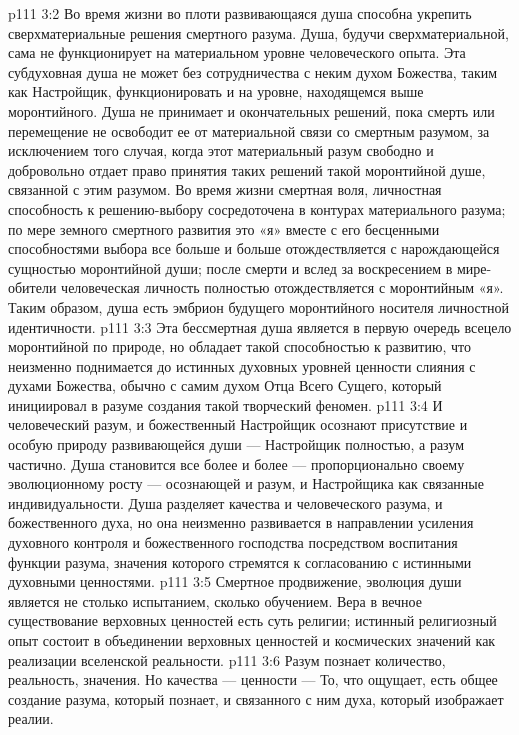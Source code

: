 \vs p111 3:2 Во время жизни во плоти развивающаяся душа способна укрепить сверхматериальные решения смертного разума. Душа, будучи сверхматериальной, сама не функционирует на материальном уровне человеческого опыта. Эта субдуховная душа не может без сотрудничества с неким духом Божества, таким как Настройщик, функционировать и на уровне, находящемся выше моронтийного. Душа не принимает и окончательных решений, пока смерть или перемещение не освободит ее от материальной связи со смертным разумом, за исключением того случая, когда этот материальный разум свободно и добровольно отдает право принятия таких решений такой моронтийной душе, связанной с этим разумом. Во время жизни смертная воля, личностная способность к решению\hyp{}выбору сосредоточена в контурах материального разума; по мере земного смертного развития это «я» вместе с его бесценными способностями выбора все больше и больше отождествляется с нарождающейся сущностью моронтийной души; после смерти и вслед за воскресением в мире\hyp{}обители человеческая личность полностью отождествляется с моронтийным «я». Таким образом, душа есть эмбрион будущего моронтийного носителя личностной идентичности.
\vs p111 3:3 Эта бессмертная душа является в первую очередь всецело моронтийной по природе, но обладает такой способностью к развитию, что неизменно поднимается до истинных духовных уровней ценности слияния с духами Божества, обычно с самим духом Отца Всего Сущего, который инициировал в разуме создания такой творческий феномен.
\vs p111 3:4 И человеческий разум, и божественный Настройщик осознают присутствие и особую природу развивающейся души --- Настройщик полностью, а разум частично. Душа становится все более и более --- пропорционально своему эволюционному росту --- осознающей и разум, и Настройщика как связанные индивидуальности. Душа разделяет качества и человеческого разума, и божественного духа, но она неизменно развивается в направлении усиления духовного контроля и божественного господства посредством воспитания функции разума, значения которого стремятся к согласованию с истинными духовными ценностями.
\vs p111 3:5 Смертное продвижение, эволюция души является не столько испытанием, сколько обучением. Вера в вечное существование верховных ценностей есть суть религии; истинный религиозный опыт состоит в объединении верховных ценностей и космических значений как реализации вселенской реальности.
\vs p111 3:6 Разум познает количество, реальность, значения. Но качества --- ценности ---  То, что ощущает, есть общее создание разума, который познает, и связанного с ним духа, который изображает реалии.
